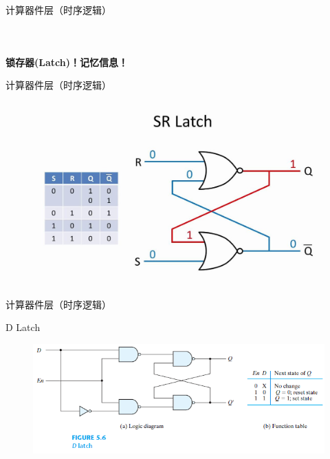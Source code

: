 \documentclass[UTF8]{ctexbeamer}
\begin{document}
\begin{frame}{计算器件层（时序逻辑）}
\begin{columns}
\begin{column}{0.5\linewidth}
\begin{figure}
\begin{tabular}{c}
\end{tabular}
\end{figure}
\end{column}
\end{columns}
\pause
\begin{center}
\Large\textbf{锁存器(Latch)！记忆信息！}
\end{center}
\end{frame}

\begin{frame}{计算器件层（时序逻辑）}
\begin{figure}
\centering
\includegraphics[width=0.8\linewidth]{fig/Lecture2/sr-latch.jpg}
\end{figure}
\end{frame}

\begin{frame}{计算器件层（时序逻辑）}
\begin{center}
\large D Latch
\end{center}
\begin{figure}
\centering
\includegraphics[width=0.9\linewidth]{fig/Lecture2/d-latch.png}
\end{figure}
\end{frame}
\end{document}
